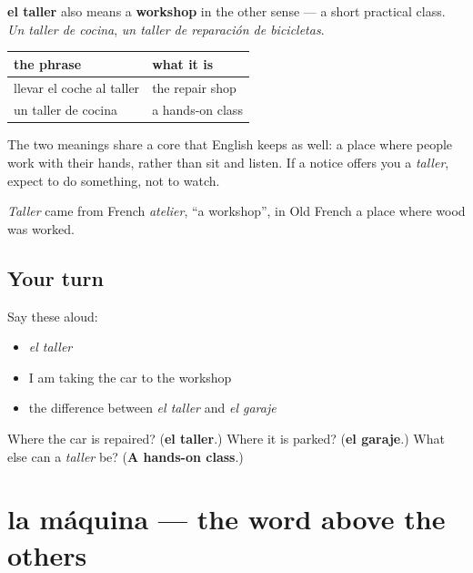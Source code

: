 \begin{cousinweb}
\textbf{el taller} also means a \textbf{workshop} in the other sense — a short practical class. \emph{Un taller de cocina}, \emph{un taller de reparación de bicicletas}.

\noindent
\begin{tabularx}{\linewidth}{@{}>{\raggedright\arraybackslash}X>{\raggedright\arraybackslash}X@{}}
\toprule
\textbf{the phrase} & \textbf{what it is} \\
\midrule
llevar el coche al taller & the repair shop \\
un taller de cocina & a hands-on class \\
\bottomrule
\end{tabularx}

The two meanings share a core that English keeps as well: a place where people work with their hands, rather than sit and listen. If a notice offers you a \emph{taller}, expect to do something, not to watch.

\emph{Taller} came from French \emph{atelier}, \textquotedblleft{}a workshop\textquotedblright{}, in Old French a place where wood was worked.
\end{cousinweb}

\subsection*{Your turn}
Say these aloud:

\begin{itemize}
\raggedright
  \item \emph{el taller}
  \item I am taking the car to the workshop
  \item the difference between \emph{el taller} and \emph{el garaje}
\end{itemize}

\begin{tcolorbox}[breakable,colback=teal!4,colframe=teal!35!black,title={Before you move on}]
Where the car is repaired? (\textbf{el taller}.) Where it is parked? (\textbf{el garaje}.) What else can a \emph{taller} be? (\textbf{A hands-on class}.)
\end{tcolorbox}
\section[la máquina]{la máquina — the word above the others}

\label{lesson:ES-C434-maquina}



